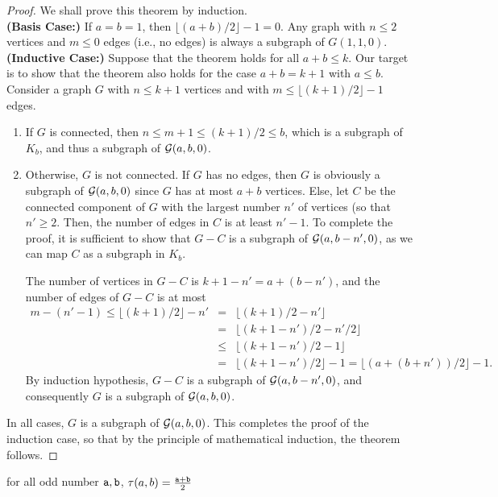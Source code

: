\begin{proof}
We shall prove this theorem by induction.  \\

\noindent
{\bf (Basis Case:)} If $a = b =1$, then $\lfloor (a+b)/2 \rfloor-1 = 0$. Any graph with $n \leq 2$ vertices and $m \leq 0$ edges (i.e., no edges) is always a subgraph of $G(1,1,0)$.
\\

\noindent
{\bf (Inductive Case:)} Suppose that the theorem holds for all $a + b \leq k$.  Our target is to show that the theorem also holds for the case $a + b = k + 1$ with $a \leq b$.   Consider a graph $G$ with  $n \leq k+1$ vertices and with $m \leq \lfloor (k+1)/2 \rfloor -1$ edges. 

\begin{enumerate}
  \item If $G$ is connected, then $n \leq m + 1 \leq (k+1)/2 \leq b$, which is a subgraph of $K_b$, 
           and thus a subgraph of ${\cal G}(a,b,0)$.   

  \item Otherwise, $G$ is not connected.  If $G$ has no edges, then $G$ is obviously a subgraph of ${\cal G}(a,b,0)$ 
          since $G$ has at most $a+b$ vertices.  
          Else, let $C$ be the connected component of $G$ with the largest number $n'$ of vertices (so that $n' \geq 2$.  
          Then, the number of edges in $C$ is at least $n'-1$.  To complete the proof, it is sufficient to show 
          that $G - C$ is a subgraph of ${\cal G}(a, b - n', 0)$, as we can map $C$ as a subgraph in $K_b$.

The number of vertices in $G-C$ is $k+1-n' = a + (b-n')$, and the number of edges of $G-C$ is at most 
\begin{eqnarray*}
m - (n'-1) \leq \lfloor (k+1)/2 \rfloor - n' &=& \lfloor (k+1)/2 - n' \rfloor \\
&=& \lfloor (k+1-n')/2 - n'/2 \rfloor \\
&\leq& \lfloor (k+1-n')/2 - 1 \rfloor \\
&=& \lfloor (k+1-n')/2 \rfloor - 1 = \lfloor (a + (b+n'))/2 \rfloor - 1.
\end{eqnarray*}
By induction hypothesis, $G-C$ is a subgraph of ${\cal G}(a, b-n', 0)$, 
and consequently $G$ is a subgraph of ${\cal G}(a,b,0)$.
\end{enumerate}
In all cases, $G$ is a subgraph of ${\cal G}(a,b,0)$.  This completes the proof of the induction case, so that by the principle of mathematical induction, the theorem follows.
\end{proof}

\begin{corollary}
for all odd number $\mathtt{a},\mathtt{b}$, $\tau(a,b)=\frac{\mathtt{a}+\mathtt{b}}{2}$
\end{corollary}
